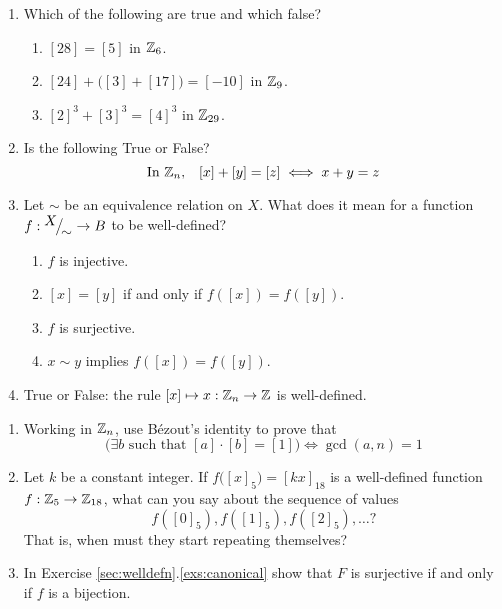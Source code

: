 \pagestyle{empty}


\begin{enumerate}
	\item Which of the following are true and which false?
  \begin{enumerate}
    \item $[28]=[5]$ in $\mathbb{Z}_6$.
    \item $[24]+\big([3]+[17]\big)=[-10]$ in $\mathbb{Z}_9$.
    \item $[2]^3+[3]^3=[4]^3$ in $\mathbb{Z}_{29}$.
	\end{enumerate}
	
	
\item Is the following True or False?
	\[
		\text{In $\mathbb{Z}_n$,}\quad [x]+[y]=[z]\iff x+y=z
	\]
	
	
	\item Let $\sim$ be an equivalence relation on $X$. What does it mean for a function $f:{}^{\textstyle {X}}\!\big/_{\textstyle \!{\sim}} \to B$ to be well-defined?
	\begin{enumerate}
    \item $f$ is injective.
    \item $[x]=[y]$ if and only if $f([x])=f([y])$.
    \item $f$ is surjective.
    \item $x\sim y$ implies $f([x])=f([y])$.
\end{enumerate}

	\item True or False: the rule $[x]\mapsto x:\mathbb{Z}_n\to\mathbb{Z}$ is well-defined.
\end{enumerate}



\begin{enumerate}
  \item Working in $\mathbb{Z}_n$, use Bézout's identity to prove that
  \[
    \bigl(\exists b\text{ such that }[a]\cdot [b] = [1]\bigr) \iff \gcd(a,n)=1
  \]

	\item Let $k$ be a constant integer. If $f\bigl([x]_5\bigr) =[kx]_{18}$ is a well-defined function $f:\mathbb{Z}_5\to\mathbb{Z}_{18}$, what can you say about the sequence of values
	\[
		f([0]_5),f([1]_5),f([2]_5),\ldots \text{?}
	\]
	That is, when must they start repeating themselves?

	\item In Exercise \ref*{sec:welldefn}.\ref*{exs:canonical} show that $F$ is surjective if and only if $f$ is a bijection.
\end{enumerate}

